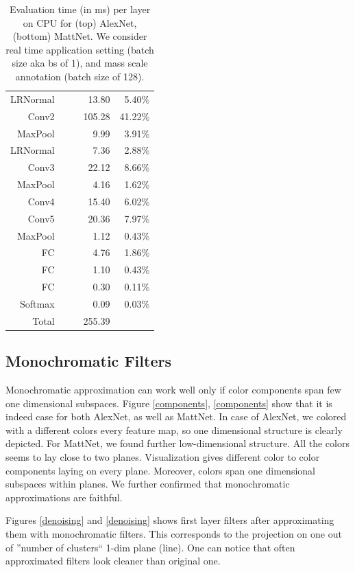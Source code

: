 \begin{table}[t]
{\begin{tabular}{rrrrr}
LRNormal & & & 13.80 & 5.40\% \\
Conv2 & & & 105.28 & 41.22\% \\
MaxPool & & & 9.99 & 3.91\% \\
LRNormal & & & 7.36 & 2.88\% \\
Conv3 & & & 22.12 & 8.66\% \\
MaxPool & & & 4.16 & 1.62\% \\
Conv4 & & & 15.40 & 6.02\% \\
Conv5 & & & 20.36 & 7.97\% \\
MaxPool & & & 1.12 & 0.43\% \\
FC & & & 4.76 & 1.86\% \\
FC & & & 1.10 & 0.43\% \\
FC & & & 0.30 & 0.11\% \\
Softmax & & & 0.09 & 0.03\%\\
\hline 
Total & & & 255.39 & \\
\hline
\end{tabular}
}
\caption{Evaluation time (in ms) per layer on CPU for (top) AlexNet, (bottom) MattNet. We consider real time application setting (batch size aka bs of 1), and
mass scale annotation (batch size of 128).} 
\label{evaluation_time}
\end{table}



\subsection{Monochromatic Filters}
Monochromatic approximation can work well only if color components span few one dimensional subspaces. 
Figure \ref{components}, \ref{components} show that it is indeed case for both AlexNet, as
well as MattNet. In case of AlexNet, we colored with a different colors every feature map, so one dimensional structure
is clearly depicted. For MattNet, we found further low-dimensional structure. All the colors seems to lay close
to two planes. Visualization gives different color to color components laying on every plane. Moreover,
colors span one dimensional subspaces within planes. We further confirmed that monochromatic approximations
are faithful. 

Figures \ref{denoising} and \ref{denoising} shows first layer filters after approximating them 
with monochromatic filters. This corresponds to the projection on one out of ''number of clusters`` 1-dim plane (line).
One can notice that often approximated filters look cleaner than original one.


